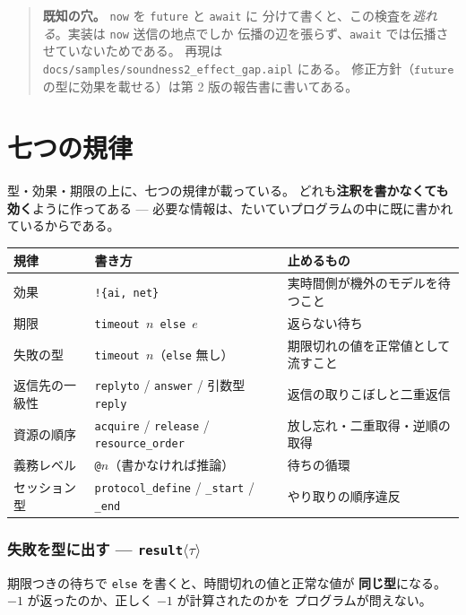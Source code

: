 \documentclass[11pt,a4paper]{ltjsarticle}
\newcommand{\ty}[1]{\ensuremath{\mathtt{#1}}}
\begin{document}
\begin{quote}\small
\textbf{既知の穴。} \texttt{now} を \texttt{future} と \texttt{await} に
分けて書くと、この検査を\emph{逃れる}。実装は \texttt{now} 送信の地点でしか
伝播の辺を張らず、\texttt{await} では伝播させていないためである。
再現は \texttt{docs/samples/}\allowbreak\texttt{soundness2\_effect\_gap.aipl}
にある。
修正方針（\ty{future} の型に効果を載せる）は第 2 版の報告書に書いてある。
\end{quote}

\part{七つの規律}
\label{part:disciplines}

型・効果・期限の上に、七つの規律が載っている。
どれも\textbf{注釈を書かなくても効く}ように作ってある ---
必要な情報は、たいていプログラムの中に既に書かれているからである。

\begin{center}
\small
\begin{tabular}{@{}lp{5.6cm}p{4.0cm}@{}}
\toprule
規律 & 書き方 & 止めるもの \\
\midrule
効果 & \texttt{!\{ai, net\}} & 実時間側が機外のモデルを待つこと \\
期限 & \texttt{timeout $n$ else $e$} & 返らない待ち \\
失敗の型 & \texttt{timeout $n$}（\texttt{else} 無し） & 期限切れの値を正常値として流すこと \\
返信先の一級性 & \texttt{replyto} / \texttt{answer} / 引数型 \texttt{reply} & 返信の取りこぼしと二重返信 \\
資源の順序 & \texttt{acquire} / \texttt{release} / \texttt{resource\_order} & 放し忘れ・二重取得・逆順の取得 \\
義務レベル & \texttt{@$n$}（書かなければ推論） & 待ちの循環 \\
セッション型 & \texttt{protocol\_define} / \texttt{\_start} / \texttt{\_end} & やり取りの順序違反 \\
\bottomrule
\end{tabular}
\end{center}

\section{失敗を型に出す --- \texttt{result}$\langle\tau\rangle$}
\label{sec:result}

期限つきの待ちで \texttt{else} を書くと、時間切れの値と正常な値が
\textbf{同じ型}になる。$-1$ が返ったのか、正しく $-1$ が計算されたのかを
プログラムが問えない。
\end{document}
